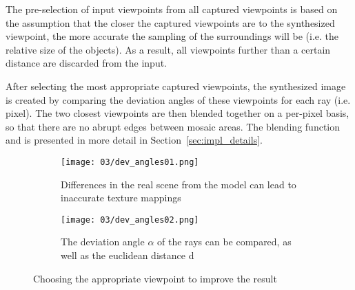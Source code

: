 The pre-selection of input viewpoints from all captured viewpoints is based on the assumption that the closer the captured viewpoints are to the synthesized viewpoint, the more accurate the sampling of the surroundings will be (i.e. the relative size of the objects). As a result, all viewpoints further than a certain distance are discarded from the input.

After selecting the most appropriate captured viewpoints, the synthesized image is created by comparing the deviation angles of these viewpoints for each ray (i.e. pixel). The two closest viewpoints are then blended together on a per-pixel basis, so that there are no abrupt edges between mosaic areas. The blending function and is presented in more detail in Section~\ref{sec:impl_details}.

\begin{figure}
\centering
    \hfill
    \begin{subfigure}[t]{0.3\textwidth}            
            \centering
            \texttt{[image: 03/dev\_angles01.png]}
            \caption{Differences in the real scene from the model can lead to inaccurate texture mappings}
    \end{subfigure}%
    \hfill
    \begin{subfigure}[t]{0.3\textwidth}
            \centering
            \texttt{[image: 03/dev\_angles02.png]}
            \caption{The deviation angle $\alpha$ of the rays can be compared, as well as the euclidean distance d}
    \end{subfigure}
    \hfill
    \hfill
    \caption[Choosing the appropriate viewpoint for texture lookup]{Choosing the appropriate viewpoint to improve the result} \label{fig:dev_angle}
\end{figure}


